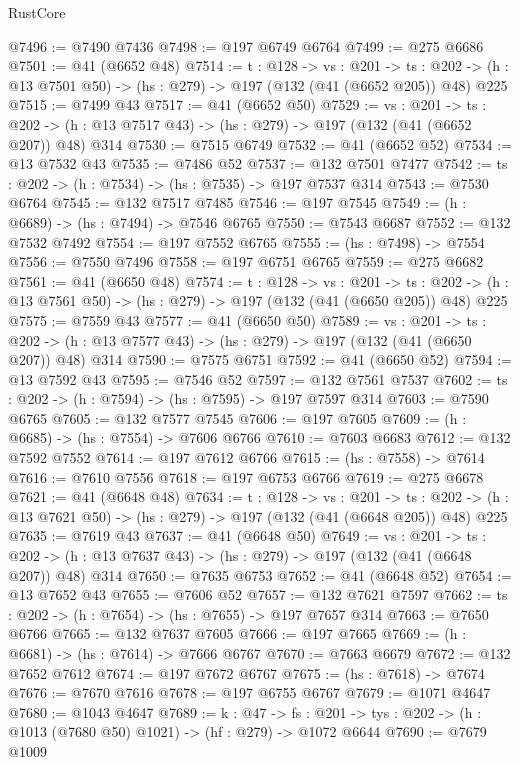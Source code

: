 \begin{lexlean}{RustCore}
\begin{coremodule}
@7496 := @7490 @7436
@7498 := @197 @6749 @6764
@7499 := @275 @6686
@7501 := @41 (@6652 @48)
@7514 := {t : @128} ->
  {vs : @201} ->
  {ts : @202} -> (h : @13 @7501 @50) -> (hs : @279) -> @197 (@132 (@41 (@6652 @205)) @48) @225
@7515 := @7499 @43
@7517 := @41 (@6652 @50)
@7529 := {vs : @201} ->
  {ts : @202} -> (h : @13 @7517 @43) -> (hs : @279) -> @197 (@132 (@41 (@6652 @207)) @48) @314
@7530 := @7515 @6749
@7532 := @41 (@6652 @52)
@7534 := @13 @7532 @43
@7535 := @7486 @52
@7537 := @132 @7501 @7477
@7542 := {ts : @202} -> (h : @7534) -> (hs : @7535) -> @197 @7537 @314
@7543 := @7530 @6764
@7545 := @132 @7517 @7485
@7546 := @197 @7545
@7549 := (h : @6689) -> (hs : @7494) -> @7546 @6765
@7550 := @7543 @6687
@7552 := @132 @7532 @7492
@7554 := @197 @7552 @6765
@7555 := (hs : @7498) -> @7554
@7556 := @7550 @7496
@7558 := @197 @6751 @6765
@7559 := @275 @6682
@7561 := @41 (@6650 @48)
@7574 := {t : @128} ->
  {vs : @201} ->
  {ts : @202} -> (h : @13 @7561 @50) -> (hs : @279) -> @197 (@132 (@41 (@6650 @205)) @48) @225
@7575 := @7559 @43
@7577 := @41 (@6650 @50)
@7589 := {vs : @201} ->
  {ts : @202} -> (h : @13 @7577 @43) -> (hs : @279) -> @197 (@132 (@41 (@6650 @207)) @48) @314
@7590 := @7575 @6751
@7592 := @41 (@6650 @52)
@7594 := @13 @7592 @43
@7595 := @7546 @52
@7597 := @132 @7561 @7537
@7602 := {ts : @202} -> (h : @7594) -> (hs : @7595) -> @197 @7597 @314
@7603 := @7590 @6765
@7605 := @132 @7577 @7545
@7606 := @197 @7605
@7609 := (h : @6685) -> (hs : @7554) -> @7606 @6766
@7610 := @7603 @6683
@7612 := @132 @7592 @7552
@7614 := @197 @7612 @6766
@7615 := (hs : @7558) -> @7614
@7616 := @7610 @7556
@7618 := @197 @6753 @6766
@7619 := @275 @6678
@7621 := @41 (@6648 @48)
@7634 := {t : @128} ->
  {vs : @201} ->
  {ts : @202} -> (h : @13 @7621 @50) -> (hs : @279) -> @197 (@132 (@41 (@6648 @205)) @48) @225
@7635 := @7619 @43
@7637 := @41 (@6648 @50)
@7649 := {vs : @201} ->
  {ts : @202} -> (h : @13 @7637 @43) -> (hs : @279) -> @197 (@132 (@41 (@6648 @207)) @48) @314
@7650 := @7635 @6753
@7652 := @41 (@6648 @52)
@7654 := @13 @7652 @43
@7655 := @7606 @52
@7657 := @132 @7621 @7597
@7662 := {ts : @202} -> (h : @7654) -> (hs : @7655) -> @197 @7657 @314
@7663 := @7650 @6766
@7665 := @132 @7637 @7605
@7666 := @197 @7665
@7669 := (h : @6681) -> (hs : @7614) -> @7666 @6767
@7670 := @7663 @6679
@7672 := @132 @7652 @7612
@7674 := @197 @7672 @6767
@7675 := (hs : @7618) -> @7674
@7676 := @7670 @7616
@7678 := @197 @6755 @6767
@7679 := @1071 @4647
@7680 := @1043 @4647
@7689 := {k : @47} ->
  {fs : @201} -> {tys : @202} -> (h : @1013 (@7680 @50) @1021) -> (hf : @279) -> @1072 @6644
@7690 := @7679 @1009

\end{coremodule}
\end{lexlean}
